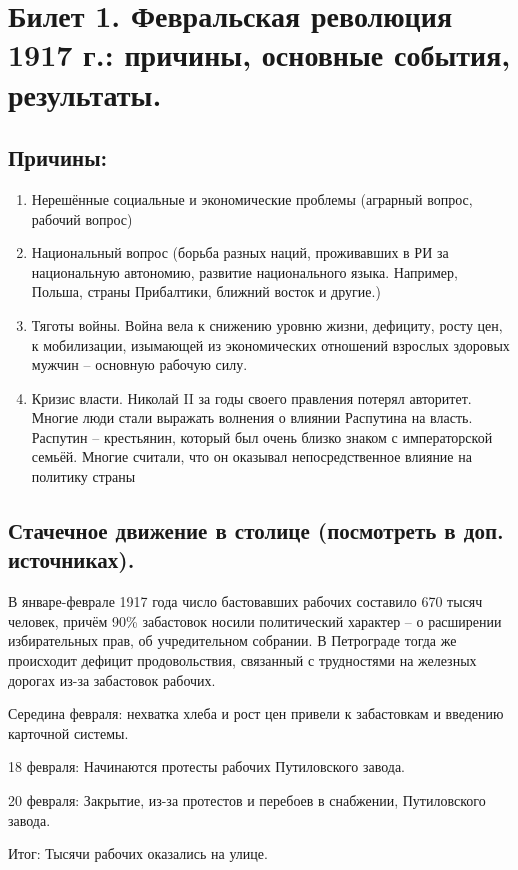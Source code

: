 \section{Билет 1. Февральская революция 1917 г.: причины, основные события, результаты.}

\subsection{Причины:}

\begin{enumerate}
    \item Нерешённые социальные и экономические проблемы (аграрный вопрос, рабочий вопрос)
    \item Национальный вопрос (борьба разных наций, проживавших в РИ за национальную автономию, развитие национального языка. Например, Польша, страны Прибалтики, ближний восток и другие.)
    \item Тяготы войны. Война вела к снижению уровню жизни, дефициту, росту цен, к мобилизации, изымающей из экономических отношений взрослых здоровых мужчин – основную рабочую силу.
    \item Кризис власти. Николай II за годы своего правления потерял авторитет. Многие люди стали выражать волнения о влиянии Распутина на власть. Распутин – крестьянин, который был очень близко знаком с императорской семьёй. Многие считали, что он оказывал непосредственное влияние на политику страны
\end{enumerate}

\subsection{Стачечное движение в столице (посмотреть в доп. источниках).}

В январе-феврале 1917 года число бастовавших рабочих составило 670 тысяч человек, причём 90\% забастовок носили политический характер – о расширении избирательных прав, об учредительном собрании. В Петрограде тогда же происходит дефицит продовольствия, связанный с трудностями на железных дорогах из-за забастовок рабочих.

Середина февраля: нехватка хлеба и рост цен привели к забастовкам и введению карточной системы.

18 февраля: Начинаются протесты рабочих Путиловского завода.

20 февраля: Закрытие, из-за протестов и перебоев в снабжении, Путиловского завода.

Итог: Тысячи рабочих оказались на улице.

